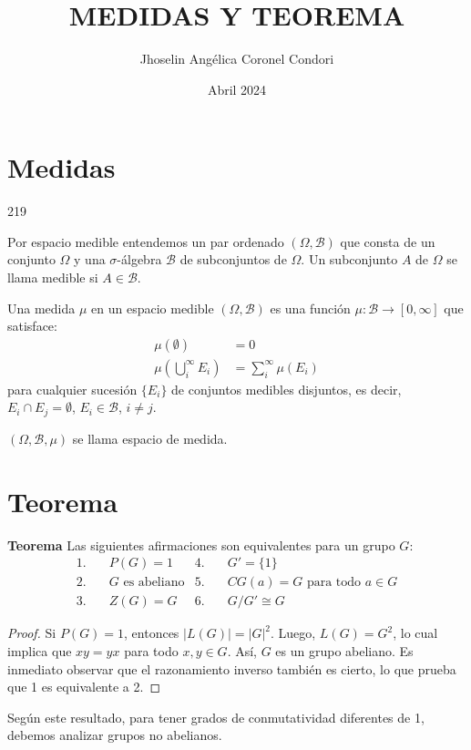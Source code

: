 \documentclass{article}
\title{MEDIDAS Y TEOREMA}
\author{Jhoselin Angélica Coronel Condori}
\date{Abril 2024}
\begin{document}
\maketitle
\section{Medidas}
\begin{dinglist}{219}
\item Por espacio medible entendemos un par ordenado $(\Omega, \mathcal{B})$ que consta de un conjunto $\Omega$ y una $\sigma$-álgebra $\mathcal{B}$ de subconjuntos de $\Omega$. Un subconjunto $A$ de $\Omega$ se llama medible si $A \in \mathcal{B}$.
\item Una medida $\mu$ en un espacio medible $(\Omega, \mathcal{B})$ es una función $\mu: \mathcal{B} \rightarrow [0, \infty]$ que satisface:
\begin{align*}
\mu(\emptyset) &= 0 \\
\mu\left(\bigcup_{i}^{\infty} E_{i}\right) &= \sum_{i}^{\infty} \mu(E_{i})
\end{align*}
para cualquier sucesión $\{E_{i}\}$ de conjuntos medibles disjuntos, es decir, $E_{i} \cap E_{j} = \emptyset$, $E_{i} \in \mathcal{B}$, $i \neq j$.
\item $(\Omega, \mathcal{B}, \mu)$ se llama espacio de medida.
 \end{dinglist} 
\section{Teorema}
 \textbf{Teorema} Las siguientes afirmaciones son equivalentes para un grupo $G$:
\begin{align*}
1. & \quad P(G) = 1 & 4. & \quad G' = \{1\} \\
2. & \quad G \text{ es abeliano} & 5. & \quad CG(a) = G \text{ para todo } a \in G \\  
3. & \quad Z(G) = G & 6. & \quad G/G' \cong G 
\end{align*}

\begin{proof}
   Si $P(G) = 1$, entonces $|L(G)| = |G|^2$. Luego, $L(G) = G^2$, lo cual implica que $xy = yx$ para todo $x, y \in G$. Así, $G$ es un grupo abeliano. Es inmediato observar que el razonamiento inverso también es cierto, lo que prueba que 1 es equivalente a 2.
\end{proof}
Según este resultado, para tener grados de conmutatividad diferentes de 1, debemos analizar grupos no abelianos. 
\end{document}
